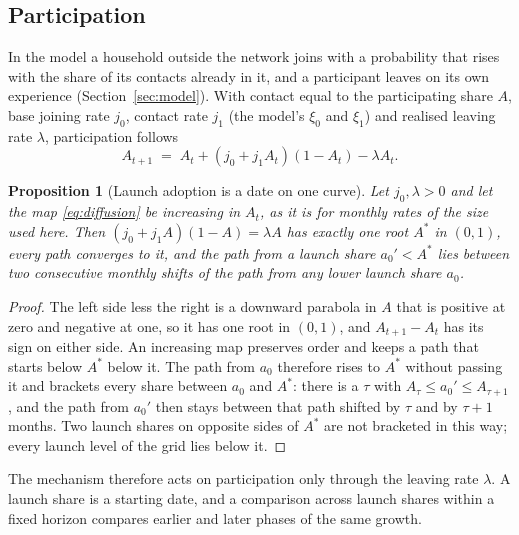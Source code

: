 \documentclass[10pt,a4paper]{article}
\newtheorem{proposition}{Proposition}
\theoremstyle{remark}
\begin{document}
\subsection{Participation}
In the model a household outside the network joins with a probability that
rises with the share of its contacts already in it, and a participant leaves
on its own experience (Section~\ref{sec:model}). With contact equal to the
participating share \(A\), base joining rate \(j_0\), contact rate \(j_1\)
(the model's \(\xi_0\) and \(\xi_1\)) and
realised leaving rate \(\lambda\), participation follows
\begin{equation}
A_{t+1} \;=\; A_t+(j_0+j_1A_t)(1-A_t)-\lambda A_t .
\label{eq:diffusion}
\end{equation}
\begin{proposition}[Launch adoption is a date on one curve]
\label{prop:diffusion}
Let \(j_0,\lambda>0\) and let the map \eqref{eq:diffusion} be increasing in
\(A_t\), as it is for monthly rates of the size used here. Then
\((j_0+j_1A)(1-A)=\lambda A\) has exactly one root \(A^{*}\) in \((0,1)\),
every path converges to it, and the path from a launch share
\(a_0'<A^{*}\) lies between two consecutive monthly shifts of the path from
any lower launch share \(a_0\).
\end{proposition}
\begin{proof}
The left side less the right is a downward parabola in \(A\) that is positive
at zero and negative at one, so it has one root in \((0,1)\), and
\(A_{t+1}-A_t\) has its sign on either side. An increasing map preserves
order and keeps a path that starts below \(A^{*}\) below it. The path from
\(a_0\) therefore rises to \(A^{*}\) without passing it and brackets every
share between \(a_0\) and \(A^{*}\): there is a \(\tau\) with
\(A_\tau\le a_0'\le A_{\tau+1}\), and the path from \(a_0'\) then stays
between that path shifted by \(\tau\) and by \(\tau+1\) months. Two launch
shares on opposite sides of \(A^{*}\) are not bracketed in this way; every
launch level of the grid lies below it.
\end{proof}
The mechanism therefore acts on participation only through the leaving rate
\(\lambda\). A launch share is a starting date, and a comparison across launch
shares within a fixed horizon compares earlier and later phases of the same
growth.



\end{document}
